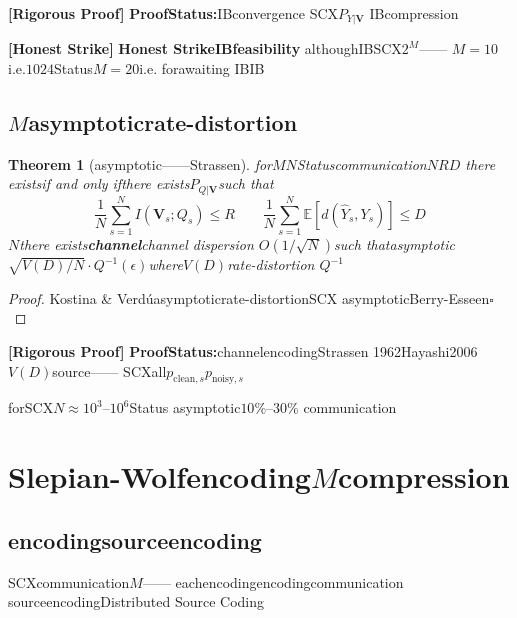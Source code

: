 \documentclass[11pt,a4paper]{article}
\newtheorem{theorem}{Theorem}[section]
\theoremstyle{remark}
\newcommand{\E}{\mathbb{E}}
\newcommand{\rigorous}{\textnormal{\textbf{[Rigorous Proof]}}}
\newcommand{\honeststrike}{\textnormal{\textbf{[Honest Strike]}}}
\begin{document}
\rigorous{} \textbf{ProofStatus:}IBconvergence
SCX$P_{Y|\mathbf{V}}$
IBcompression

\honeststrike{} \textbf{Honest StrikeIBfeasibility}
althoughIBSCX$2^M$——
$M=10$i.e.$1024$Status$M=20$i.e.
forawaiting\textbf{}\textbf{}
\textbf{}IBIB\cite{alemi2017deep_ib}
\textbf{}

\subsection{$M$asymptoticrate-distortion}

\begin{theorem}[asymptotic——Strassen]
\label{thm:nonasymptotic_rdt}
for$M$$N$Statuscommunication$NR$$D$
there existsif and only ifthere exists$P_{Q|\mathbf{V}}$such that
\begin{equation}
    \boxed{\frac{1}{N} \sum_{s=1}^{N} I(\mathbf{V}_s; Q_s) \leq R
    \quad \text{} \quad
    \frac{1}{N} \sum_{s=1}^{N} \E[d(\hat{Y}_s, Y_s)] \leq D}
\end{equation}
$N$there exists\textbf{channel}channel dispersion
$O(1/\sqrt{N})$such thatasymptotic
$\sqrt{V(D)/N} \cdot Q^{-1}(\epsilon)$where$V(D)$rate-distortion
$Q^{-1}$
\end{theorem}

\begin{proof}
Kostina \& Verd\'{u}\cite{kostina2012}asymptoticrate-distortionSCX
asymptoticBerry-Esseen\hfill $\square$
\end{proof}

\rigorous{} \textbf{ProofStatus:}channelencodingStrassen
1962Hayashi2006$V(D)$source——
SCXall$p_{\text{clean},s}$$p_{\text{noisy},s}$

\textbf{}forSCX$N \approx 10^3$--$10^6$Status
asymptotic$10\%$--$30\%$
communication

\section{Slepian-Wolfencoding$M$compression}

\subsection{encodingsourceencoding}

SCXcommunication$M$\textbf{}——
eachencodingencodingcommunication
sourceencodingDistributed Source Coding
\end{document}
